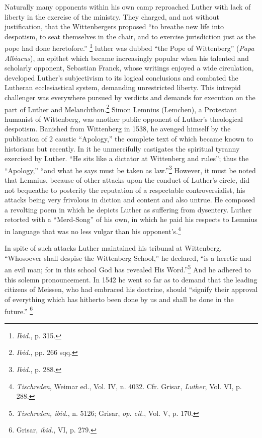 Naturally many opponents within his own camp reproached Luther
with lack of liberty in the exercise of the ministry. They charged,
and not without justification, that the Wittenbergers proposed “to
breathe new life into despotism, to seat themselves in the chair, and
to exercise jurisdiction just as the pope had done heretofore.”
\footnote{\textit{Ibid.}, p. 315.}
luther was dubbed “the Pope of Wittenberg” (\textit{Papa Albiacus}), an
epithet which became increasingly popular when his talented and
scholarly opponent, Sebastian Franck, whose writings enjoyed a wide
circulation, developed Luther’s subjectivism to its logical conclusions
and combated the Lutheran ecclesiastical system, demanding unrestricted
liberty. This intrepid challenger was everywhere pursued by
verdicts and demands for execution on the part of Luther and
Melanchthon.\footnote{\textit{Ibid.}, pp. 266 sqq.}
Simon Lemnius (Lemchen), a Protestant humanist of
Wittenberg, was another public opponent of Luther’s theological
despotism. Banished from Wittenberg in 1538, he avenged himself by
the publication of 2 caustic “Apology,” the complete text of which
became known to historians but recently. In it he unmercifully
castigates the spiritual tyranny exercised by Luther. “He sits like a
dictator at Wittenberg and rules”; thus the “Apology,” “and what
he says must be taken as law.”\footnote{\textit{Ibid.}, p. 288.}
However, it must be noted that
Lemnius, because of other attacks upon the conduct of Luther’s circle,
did not bequeathe to posterity the reputation of a respectable
controversialist, his attacks being very frivolous
in diction and content and also untrue. He composed a revolting poem in which he
depicts Luther as suffering from dysentery. Luther retorted with a
“Merd-Song” of his own, in which he paid his respects to Lemnius in
language that was no less vulgar than his opponent’s.\footnote
{\textit{Tischreden}, Weimar ed., Vol. IV, n. 4032. Cfr. Grisar, \textit{Luther}, Vol. VI, p. 288.}

In spite of such attacks Luther maintained his tribunal at Wittenberg.
“Whosoever shall despise the Wittenberg School,” he declared,
“is a heretic and an evil man; for in this school God has revealed His
Word.”\footnote{\textit{Tischreden, ibid.}, n. 5126; Grisar, \textit{op. cit.}, Vol. V, p. 170.}
And he adhered to this solemn pronouncement. In 1542 he
went so far as to demand that the leading citizens of Meissen, who
had embraced his doctrine, should “signify their approval of everything
which has hitherto been done by us and shall be done in the
future.”
\footnote{Grisar, \textit{ibid.}, VI, p. 279.}


